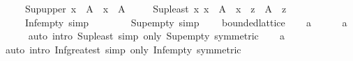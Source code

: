 \begin{isabellebody}
\ \ \ \ \ Sup{\isacharunderscore}{\kern0pt}upper{\isacharcolon}{\kern0pt}\ {\isachardoublequoteopen}x\ {\isasymin}\ A\ {\isasymLongrightarrow}\ x\ {\isasymle}\ {\isasymSqunion}A{\isachardoublequoteclose}\isanewline
\ \ \ \ \ Sup{\isacharunderscore}{\kern0pt}least{\isacharcolon}{\kern0pt}\ {\isachardoublequoteopen}{\isacharparenleft}{\kern0pt}{\isasymAnd}x{\isachardot}{\kern0pt}\ x\ {\isasymin}\ A\ {\isasymLongrightarrow}\ x\ {\isasymle}\ z{\isacharparenright}{\kern0pt}\ {\isasymLongrightarrow}\ {\isasymSqunion}A\ {\isasymle}\ z{\isachardoublequoteclose}\isanewline
\ \ \ \ \ Inf{\isacharunderscore}{\kern0pt}empty\ {\isacharbrackleft}{\kern0pt}simp{\isacharbrackright}{\kern0pt}{\isacharcolon}{\kern0pt}\ {\isachardoublequoteopen}{\isasymSqinter}{\isacharbraceleft}{\kern0pt}{\isacharbraceright}{\kern0pt}\ {\isacharequal}{\kern0pt}\ {\isasymtop}{\isachardoublequoteclose}\isanewline
\ \ \ \ \ Sup{\isacharunderscore}{\kern0pt}empty\ {\isacharbrackleft}{\kern0pt}simp{\isacharbrackright}{\kern0pt}{\isacharcolon}{\kern0pt}\ {\isachardoublequoteopen}{\isasymSqunion}{\isacharbraceleft}{\kern0pt}{\isacharbraceright}{\kern0pt}\ {\isacharequal}{\kern0pt}\ {\isasymbottom}{\isachardoublequoteclose}\isanewline
{}\isanewline
\isanewline
{}\isamarkupfalse%
\ bounded{\isacharunderscore}{\kern0pt}lattice\isanewline
%
\isadelimproof
%
\endisadelimproof
%
\isatagproof
{}\isamarkupfalse%
\isanewline
\ \ \isamarkupfalse%
\ a\isanewline
\ \ \isamarkupfalse%
\ {\isachardoublequoteopen}{\isasymbottom}\ {\isasymle}\ a{\isachardoublequoteclose}\isanewline
\ \ \ \ \isamarkupfalse%
\ {\isacharparenleft}{\kern0pt}auto\ intro{\isacharcolon}{\kern0pt}\ Sup{\isacharunderscore}{\kern0pt}least\ simp\ only{\isacharcolon}{\kern0pt}\ Sup{\isacharunderscore}{\kern0pt}empty\ {\isacharbrackleft}{\kern0pt}symmetric{\isacharbrackright}{\kern0pt}{\isacharparenright}{\kern0pt}\isanewline
\ \ \isamarkupfalse%
\ {\isachardoublequoteopen}a\ {\isasymle}\ {\isasymtop}{\isachardoublequoteclose}\isanewline
\ \ \ \ \isamarkupfalse%
\ {\isacharparenleft}{\kern0pt}auto\ intro{\isacharcolon}{\kern0pt}\ Inf{\isacharunderscore}{\kern0pt}greatest\ simp\ only{\isacharcolon}{\kern0pt}\ Inf{\isacharunderscore}{\kern0pt}empty\ {\isacharbrackleft}{\kern0pt}symmetric{\isacharbrackright}{\kern0pt}{\isacharparenright}{\kern0pt}\isanewline
{}\isamarkupfalse%
%
\endisatagproof
{\isafoldproof}%
%
\isadelimproof
\isanewline

\end{isabellebody}
